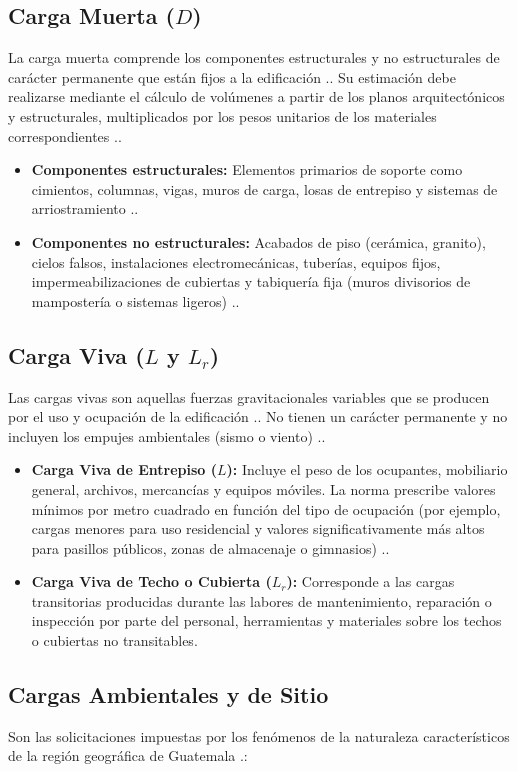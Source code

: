 \documentclass[14pt,letterpaper]{extarticle}
\begin{document}
	\subsection{Carga Muerta ($D$)}
	La carga muerta comprende los componentes estructurales y no estructurales de carácter permanente que están fijos a la edificación .. Su estimación debe realizarse mediante el cálculo de volúmenes a partir de los planos arquitectónicos y estructurales, multiplicados por los pesos unitarios de los materiales correspondientes ..
	
	\begin{itemize}
		\item \textbf{Componentes estructurales:} Elementos primarios de soporte como cimientos, columnas, vigas, muros de carga, losas de entrepiso y sistemas de arriostramiento ..
		\item \textbf{Componentes no estructurales:} Acabados de piso (cerámica, granito), cielos falsos, instalaciones electromecánicas, tuberías, equipos fijos, impermeabilizaciones de cubiertas y tabiquería fija (muros divisorios de mampostería o sistemas ligeros) ..
	\end{itemize}
	
	\subsection{Carga Viva ($L$ y $L_r$)}
	Las cargas vivas son aquellas fuerzas gravitacionales variables que se producen por el uso y ocupación de la edificación .. No tienen un carácter permanente y no incluyen los empujes ambientales (sismo o viento) ..
	
	\begin{itemize}
		\item \textbf{Carga Viva de Entrepiso ($L$):} Incluye el peso de los ocupantes, mobiliario general, archivos, mercancías y equipos móviles. La norma prescribe valores mínimos por metro cuadrado en función del tipo de ocupación (por ejemplo, cargas menores para uso residencial y valores significativamente más altos para pasillos públicos, zonas de almacenaje o gimnasios) ..
		\item \textbf{Carga Viva de Techo o Cubierta ($L_r$):} Corresponde a las cargas transitorias producidas durante las labores de mantenimiento, reparación o inspección por parte del personal, herramientas y materiales sobre los techos o cubiertas no transitables.
	\end{itemize}
	
	\subsection{Cargas Ambientales y de Sitio}
	Son las solicitaciones impuestas por los fenómenos de la naturaleza característicos de la región geográfica de Guatemala .:
	
\end{document}

